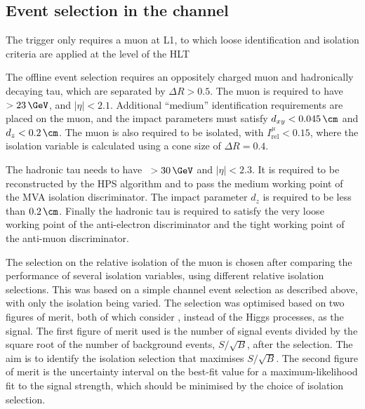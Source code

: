 \subsection{\texorpdfstring{Event selection in the \mutau channel}{Event selection in the mu tau channel}}
\label{sec:mssm_eventsel_mt}
The trigger only requires a muon at \ac{L1}, to which loose identification and
isolation criteria are applied at the level of the \ac{HLT}

The offline event selection requires an oppositely charged
muon and hadronically decaying tau, which are separated by $\Delta R > 0.5$.
The muon is required to have \pT~$> 23\,\GeV$, and $|\eta| < 2.1$. %
Additional ``medium'' identification requirements are placed on the muon, and the impact
parameters must satisfy $d_{xy}<0.045\,\cm$ and $d_{z}<0.2\,\cm$. The muon is also
required to be isolated, with $I_{\text{rel}}^{\mu}<0.15$, where the isolation variable
is calculated using a cone size of $\Delta R = 0.4$.

The hadronic tau needs to have \pT~$>30\,\GeV$ and $|\eta|<2.3$.
It is required to be reconstructed by the HPS algorithm and to pass the medium
working point of the MVA isolation discriminator. The impact parameter $d_{z}$ is
required to be less than $0.2\,\cm$. Finally the hadronic tau is required
to satisfy the very loose working point of the anti-electron discriminator
and the tight working point of the anti-muon discriminator.

The selection on the relative isolation of the muon is chosen after comparing
the performance of several isolation variables, using different relative isolation selections.
This was based on a simple \mutau channel
event selection as described above, with only the isolation being varied.
The selection was optimised based on two figures of merit, both of
which consider \Ztautau, instead of the Higgs processes, as the signal.
The first figure of merit used is the number of signal events divided by the
square root of the number of background events, $S/\sqrt{B}$, after
the selection. The aim is to identify 
the isolation selection that maximises $S/\sqrt{B}$. The second figure of merit
is the uncertainty interval on the best-fit value for a maximum-likelihood fit
to the \Ztautau signal strength, which should be minimised by the choice of
isolation selection.

